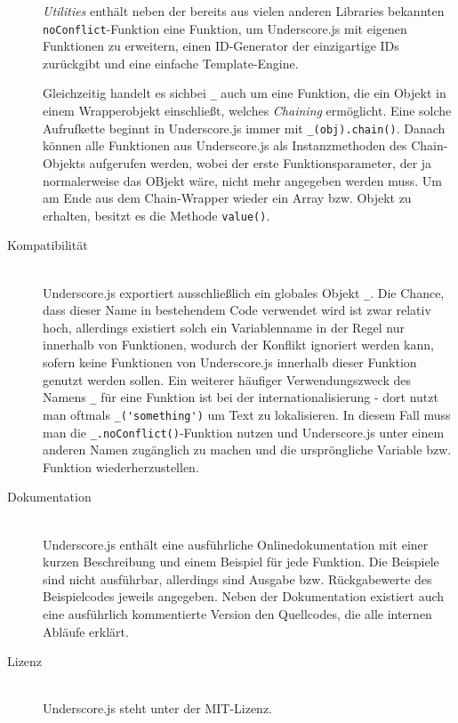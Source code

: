 \begin{description}
\emph{Utilities} enthält neben der bereits aus vielen anderen Libraries bekannten
\lstinline{noConflict}-Funktion eine Funktion, um Underscore.js mit eigenen Funktionen zu erweitern,
einen ID-Generator der einzigartige IDs zurückgibt und eine einfache Template-Engine.

Gleichzeitig handelt es sichbei \lstinline{_} auch um eine Funktion, die ein Objekt in einem
Wrapperobjekt einschließt, welches \emph{Chaining} ermöglicht. Eine solche Aufrufkette beginnt in
Underscore.js immer mit \lstinline{_(obj).chain()}. Danach können alle Funktionen aus Underscore.js
als Instanzmethoden des Chain-Objekts aufgerufen werden, wobei der erste Funktionsparameter, der ja
normalerweise das OBjekt wäre, nicht mehr angegeben werden muss. Um am Ende aus dem Chain-Wrapper
wieder ein Array bzw. Objekt zu erhalten, besitzt es die Methode \lstinline{value()}.

\item[Kompatibilität] \hfill \\
Underscore.js exportiert ausschließlich ein globales Objekt \lstinline{_}. Die Chance, dass dieser
Name in bestehendem Code verwendet wird ist zwar relativ hoch, allerdings existiert solch ein
Variablenname in der Regel nur innerhalb von Funktionen, wodurch der Konflikt ignoriert werden kann,
sofern keine Funktionen von Underscore.js innerhalb dieser Funktion genutzt werden sollen. Ein
weiterer häufiger Verwendungszweck des Namens \lstinline{_} für eine Funktion ist bei der
internationalisierung - dort nutzt man oftmals \lstinline{_('something')} um Text zu lokalisieren.
In diesem Fall muss man die \lstinline{_.noConflict()}-Funktion nutzen und Underscore.js unter einem
anderen Namen zugänglich zu machen und die urspröngliche Variable bzw. Funktion wiederherzustellen.

\item[Dokumentation] \hfill \\
Underscore.js enthält eine ausführliche Onlinedokumentation mit einer kurzen Beschreibung und einem
Beispiel für jede Funktion. Die Beispiele sind nicht ausführbar, allerdings sind Ausgabe bzw.
Rückgabewerte des Beispielcodes jeweils angegeben. Neben der Dokumentation existiert auch eine
ausführlich kommentierte Version den Quellcodes, die alle internen Abläufe erklärt.

\item[Lizenz] \hfill \\
Underscore.js steht unter der MIT-Lizenz.
\end{description}
